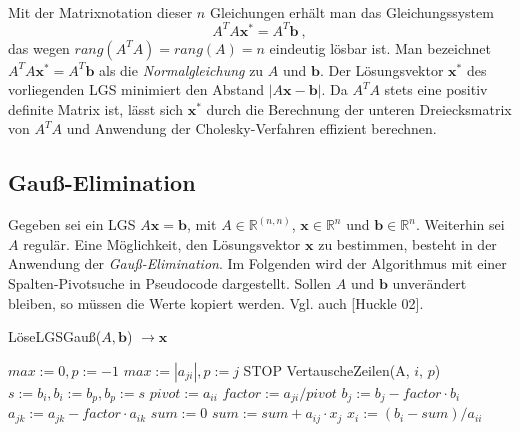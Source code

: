 \vspace{11pt} \\
Mit der Matrixnotation dieser $n$ Gleichungen erhält man das Gleichungssystem
\begin{equation}
A^TA\bm{x}^* = A^T\bm{b}\ , \nonumber
\end{equation}
das wegen $rang(A^TA) = rang(A) = n$ eindeutig lösbar ist. Man bezeichnet $A^TA\bm{x}^* = A^T\bm{b}$ als die \emph{Normalgleichung} zu $A$ und $\bm{b}$. Der Lösungsvektor $\bm{x}^*$ des vorliegenden LGS minimiert den Abstand $|A\bm{x} - \bm{b}|$. Da $A^TA$ stets eine positiv definite Matrix ist, lässt sich $\bm{x}^*$ durch die Berechnung der unteren Dreiecksmatrix von $A^TA$ und Anwendung der Cholesky-Verfahren effizient berechnen.
\clearpage

\subsection{Gauß-Elimination}
Gegeben sei ein LGS $A\bm{x} = \bm{b}$, mit $A \in \mathbb{R}^{(n, n)}$, $\bm{x} \in \mathbb{R}^n$ und $\bm{b} \in \mathbb{R}^n$. Weiterhin sei $A$ regulär. Eine Möglichkeit, den Lösungsvektor $\bm{x}$ zu bestimmen, besteht in der Anwendung der \emph{Gauß-Elimination}. Im Folgenden wird der Algorithmus mit einer Spalten-Pivotsuche in Pseudocode dargestellt. Sollen $A$ und $\bm{b}$ unverändert bleiben, so müssen die Werte kopiert werden. Vgl. auch [Huckle 02].
\begin{algorithm}
\caption{LöseLGSGauß($A, \textbf{b}$) $\rightarrow \bm{x}$}
\label{gauss}
\begin{algorithmic}
{\small
{}
  \STATE $max := 0, p := -1$
  \STATE
      \STATE $max := |a_{ji}|, p := j$
    \ENDIF
  \ENDFOR
  \STATE
    \STATE STOP 
  \ENDIF
  \STATE
    \STATE VertauscheZeilen(A, $i$, $p$)
    \STATE $s := b_i, b_i := b_p, b_p := s$
  \ENDIF
  \STATE
  \STATE $pivot := a_{ii}$
  \STATE
    \STATE $factor := a_{ji} / pivot$
    \STATE $b_j := b_j - factor \cdot b_i$
      \STATE $a_{jk} := a_{jk} - factor \cdot a_{ik}$
    \ENDFOR
  \ENDFOR
\ENDFOR
\STATE
{}
  \STATE $sum := 0$
    \STATE $sum := sum + a_{ij} \cdot x_j$
  \ENDFOR
  \STATE $x_i := (b_i - sum) / a_{ii}$
\ENDFOR
}
\end{algorithmic}
\end{algorithm}
\clearpage

